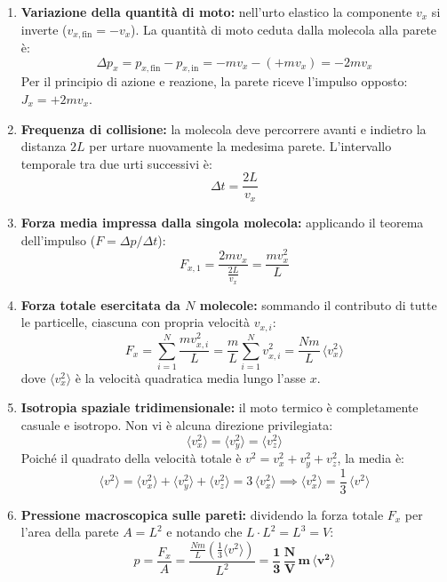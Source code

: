 \documentclass[11pt,a4paper,oneside]{report}
\begin{document}
\begin{enumerate}
  \item \textbf{Variazione della quantità di moto:} nell'urto elastico la componente $v_x$ si inverte ($v_{x,\text{fin}} = -v_x$). La quantità di moto ceduta dalla molecola alla parete è:
  \[
  \Delta p_x = p_{x,\text{fin}} - p_{x,\text{in}} = -m v_x - (+m v_x) = -2 m v_x
  \]
  Per il principio di azione e reazione, la parete riceve l'impulso opposto: $J_x = +2 m v_x$.
  
  \item \textbf{Frequenza di collisione:} la molecola deve percorrere avanti e indietro la distanza $2L$ per urtare nuovamente la medesima parete. L'intervallo temporale tra due urti successivi è:
  \[
  \Delta t = \frac{2 L}{v_x}
  \]
  
  \item \textbf{Forza media impressa dalla singola molecola:} applicando il teorema dell'impulso ($F = \Delta p / \Delta t$):
  \[
  F_{x,1} = \frac{2 m v_x}{\frac{2 L}{v_x}} = \frac{m v_x^2}{L}
  \]

  \item \textbf{Forza totale esercitata da $N$ molecole:} sommando il contributo di tutte le particelle, ciascuna con propria velocità $v_{x,i}$:
  \[
  F_x = \sum_{i=1}^N \frac{m v_{x,i}^2}{L} = \frac{m}{L} \sum_{i=1}^N v_{x,i}^2 = \frac{N m}{L} \, \langle v_x^2 \rangle
  \]
  dove $\langle v_x^2 \rangle$ è la velocità quadratica media lungo l'asse $x$.

  \item \textbf{Isotropia spaziale tridimensionale:} il moto termico è completamente casuale e isotropo. Non vi è alcuna direzione privilegiata:
  \[
  \langle v_x^2 \rangle = \langle v_y^2 \rangle = \langle v_z^2 \rangle
  \]
  Poiché il quadrato della velocità totale è $v^2 = v_x^2 + v_y^2 + v_z^2$, la media è:
  \[
  \langle v^2 \rangle = \langle v_x^2 \rangle + \langle v_y^2 \rangle + \langle v_z^2 \rangle = 3 \, \langle v_x^2 \rangle \implies \langle v_x^2 \rangle = \frac{1}{3} \, \langle v^2 \rangle
  \]

  \item \textbf{Pressione macroscopica sulle pareti:} dividendo la forza totale $F_x$ per l'area della parete $A = L^2$ e notando che $L \cdot L^2 = L^3 = V$:
  \[
  p = \frac{F_x}{A} = \frac{\frac{N m}{L} \left(\frac{1}{3} \langle v^2 \rangle\right)}{L^2} = \mathbf{\frac{1}{3} \, \frac{N}{V} \, m \, \langle v^2 \rangle}
  \]
\end{enumerate}
\end{document}
